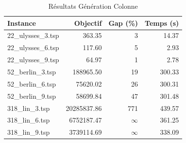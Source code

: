 \begin{table}[H]
\centering
\caption{Résultats Génération Colonne}
\small
\begin{tabular}{|l|r|r|r|}
\hline
\textbf{Instance} & \textbf{Objectif} & \textbf{Gap (\%)} & \textbf{Temps (s)} \\
\hline
22\_ulysses\_3.tsp & 363.35 & 3 & 14.37 \\
22\_ulysses\_6.tsp & 117.60 & 5 & 2.93 \\
22\_ulysses\_9.tsp & 64.97 & 1 & 2.78 \\
52\_berlin\_3.tsp & 188965.50 & 19 & 300.33 \\
52\_berlin\_6.tsp & 75620.02 & 26 & 300.31 \\
52\_berlin\_9.tsp & 58699.84 & 47 & 301.48 \\
318\_lin\_3.tsp & 20285837.86 & 771 & 439.57 \\
318\_lin\_6.tsp & 6752187.47 & $\infty$ & 361.25 \\
318\_lin\_9.tsp & 3739114.69 & $\infty$ & 338.09 \\
\hline
\end{tabular}
\end{table}
